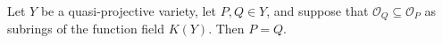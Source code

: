Let $Y$ be a quasi-projective variety, let $P, Q \in Y$, and suppose that $\mathcal{O}_Q \subseteq \mathcal{O}_P$ as subrings of the function field $K(Y)$. Then $P = Q$.
